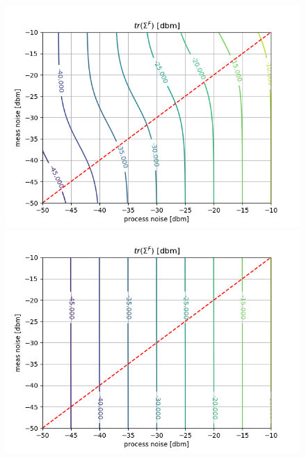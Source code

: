 \documentclass[oneside,12pt]{article}
\begin{document}
\begin{figure}[!tbp]
  \centering
  \begin{minipage}[b]{0.45\textwidth}
    \includegraphics[width=\textwidth]{./fig_1d_filt_f09}
  \end{minipage}
  \begin{minipage}[b]{0.45\textwidth}
    \includegraphics[width=\textwidth]{./fig_1d_filt_f01}
  \end{minipage}
  \vfill
  \begin{minipage}[b]{0.45\textwidth}

\end{minipage}
\end{figure}
\end{document}
